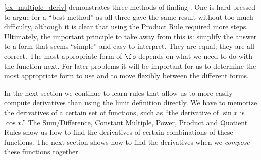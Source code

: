 \autoref{ex_multiple_deriv} demonstrates three methods of finding \fp. One is hard pressed to argue for a ``best method'' as all three gave the same result without too much difficulty, although it is clear that using the Product Rule required more steps. Ultimately, the important principle to take away from this is: simplify the answer to a form that seems ``simple'' and easy to interpret.  They are equal; they are all correct. The most appropriate form of $\fp$ depends on what we need to do with the function next. For later problems it will be important for us to determine the most appropriate form to use and to move flexibly between the different forms.
		
In the next section we continue to learn rules that allow us to more easily compute derivatives than using the limit definition directly. We have to memorize the derivatives of a certain set of functions, such as ``the derivative of $\sin x$ is $\cos x$.'' The Sum/Difference, Constant Multiple, Power, Product and Quotient Rules show us how to find the derivatives of certain combinations of these functions. The next section shows how to find the derivatives when we \emph{compose} these functions together.

